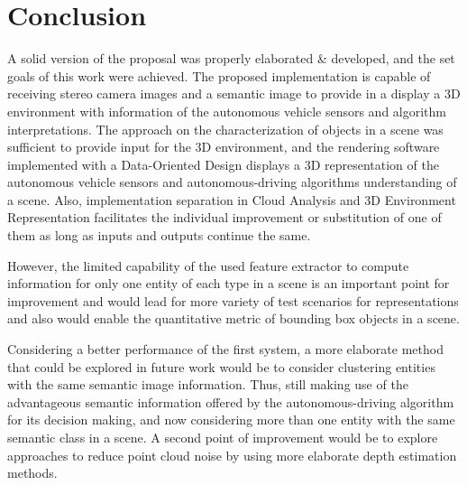 \chapter{Conclusion} \label{final_considerations}




A solid version of the proposal was properly elaborated \& developed, and the set goals of this work were achieved. The proposed implementation is capable of receiving stereo camera images and a semantic image to provide in a display a 3D environment with information of the autonomous vehicle sensors and algorithm interpretations. The approach on the characterization of objects in a scene was sufficient to provide input for the 3D environment, and the rendering software implemented with a Data-Oriented Design displays a 3D representation of the autonomous vehicle sensors and autonomous-driving algorithms understanding of a scene. Also, implementation separation in Cloud Analysis and 3D Environment Representation facilitates the individual improvement or substitution of one of them as long as inputs and outputs continue the same. 

However, the limited capability of the used feature extractor to compute information for only one entity of each type in a scene is an important point for improvement and would lead for more variety of test scenarios for representations and also would enable the quantitative metric of bounding box objects in a scene. 

Considering a better performance of the first system, a more elaborate method that could be explored in future work would be to consider clustering entities with the same semantic image information. Thus, still making use of the advantageous semantic information offered by the autonomous-driving algorithm for its decision making, and now considering more than one entity with the same semantic class in a scene. A second point of improvement would be to explore approaches to reduce point cloud noise by using more elaborate depth estimation methods.

